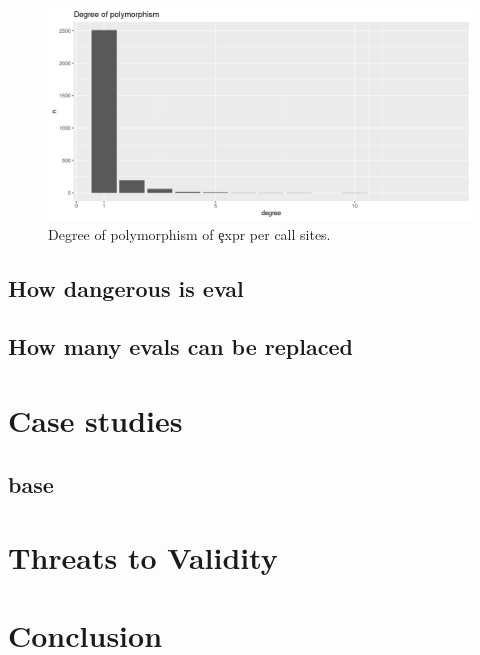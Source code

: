 \documentclass[conference]{IEEEtran}
\begin{document}
\begin{figure}
    \includegraphics[width=\columnwidth]{polymorphism}
    \caption{Degree of polymorphism of \c{expr} per call sites.} \label{fig:polymorphism}
\end{figure}

\subsection{How dangerous is eval}

\subsection{How many evals can be replaced}

\section{Case studies}

\subsection{base}

\section{Threats to Validity}

\section{Conclusion}



\end{document}
